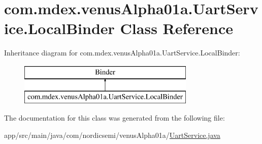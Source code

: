 \hypertarget{classcom_1_1mdex_1_1venus_alpha01a_1_1_uart_service_1_1_local_binder}{}\section{com.\+mdex.\+venus\+Alpha01a.\+Uart\+Service.\+Local\+Binder Class Reference}
\label{classcom_1_1mdex_1_1venus_alpha01a_1_1_uart_service_1_1_local_binder}
Inheritance diagram for com.\+mdex.\+venus\+Alpha01a.\+Uart\+Service.\+Local\+Binder\+:\begin{figure}[H]
\begin{center}
\leavevmode
\includegraphics[height=2.000000cm]{classcom_1_1mdex_1_1venus_alpha01a_1_1_uart_service_1_1_local_binder}
\end{center}
\end{figure}


The documentation for this class was generated from the following file\+:\begin{DoxyCompactItemize}
\item 
app/src/main/java/com/nordicsemi/venus\+Alpha01a/\hyperlink{_uart_service_8java}{Uart\+Service.\+java}\end{DoxyCompactItemize}
